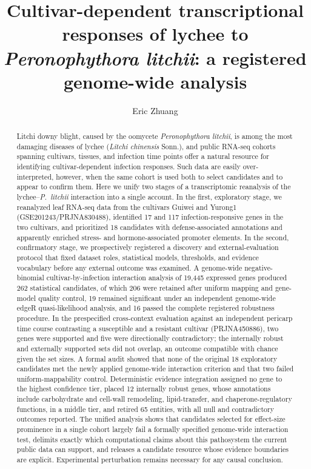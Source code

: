 \documentclass[11pt]{article}
\title{\bfseries Cultivar-dependent transcriptional responses of lychee to \textit{Peronophythora litchii}: a registered genome-wide analysis}
\author{Eric Zhuang}
\date{}
\newcommand{\Pl}{\textit{P.~litchii}}
\begin{document}
\maketitle

\begin{abstract}
\noindent
Litchi downy blight, caused by the oomycete \textit{Peronophythora litchii}, is among the most damaging diseases of lychee (\textit{Litchi chinensis} Sonn.), and public RNA-seq cohorts spanning cultivars, tissues, and infection time points offer a natural resource for identifying cultivar-dependent infection responses. Such data are easily over-interpreted, however, when the same cohort is used both to select candidates and to appear to confirm them. Here we unify two stages of a transcriptomic reanalysis of the lychee--\Pl{} interaction into a single account. In the first, exploratory stage, we reanalyzed leaf RNA-seq data from the cultivars Guiwei and Yurong1 (GSE201243/PRJNA830488), identified 17 and 117 infection-responsive genes in the two cultivars, and prioritized 18 candidates with defense-associated annotations and apparently enriched stress- and hormone-associated promoter elements. In the second, confirmatory stage, we prospectively registered a discovery and external-evaluation protocol that fixed dataset roles, statistical models, thresholds, and evidence vocabulary before any external outcome was examined. A genome-wide negative-binomial cultivar-by-infection interaction analysis of 19,445 expressed genes produced 262 statistical candidates, of which 206 were retained after uniform mapping and gene-model quality control, 19 remained significant under an independent genome-wide edgeR quasi-likelihood analysis, and 16 passed the complete registered robustness procedure. In the prespecified cross-context evaluation against an independent pericarp time course contrasting a susceptible and a resistant cultivar (PRJNA450886), two genes were supported and five were directionally contradictory; the internally robust and externally supported sets did not overlap, an outcome compatible with chance given the set sizes. A formal audit showed that none of the original 18 exploratory candidates met the newly applied genome-wide interaction criterion and that two failed uniform-mappability control. Deterministic evidence integration assigned no gene to the highest confidence tier, placed 12 internally robust genes, whose annotations include carbohydrate and cell-wall remodeling, lipid-transfer, and chaperone-regulatory functions, in a middle tier, and retired 65 entities, with all null and contradictory outcomes reported. The unified analysis shows that candidates selected for effect-size prominence in a single cohort largely fail a formally specified genome-wide interaction test, delimits exactly which computational claims about this pathosystem the current public data can support, and releases a candidate resource whose evidence boundaries are explicit. Experimental perturbation remains necessary for any causal conclusion.


\end{abstract}
\end{document}
